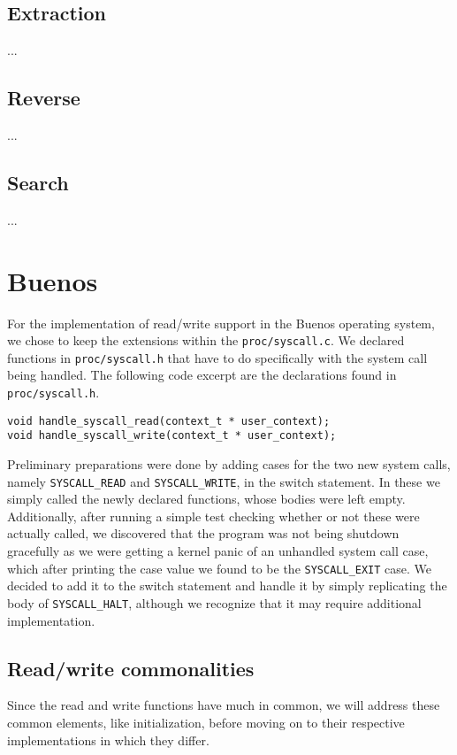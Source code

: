 \documentclass[11pt]{article}
\newcommand{\code}[1]{{\tt #1}}
\newcommand{\file}[1]{{\tt #1}}
\begin{document}
\subsection{Extraction}
...

\subsection{Reverse}
...

\subsection{Search}
...

\newpage
\section{Buenos}
For the implementation of read/write support in the Buenos operating system,
we chose to keep the extensions within the \file{proc/syscall.c}. We declared
functions in \file{proc/syscall.h} that have to do specifically with the
system call being handled. The following code excerpt are the declarations
found in \file{proc/syscall.h}.

\begin{lstlisting}
void handle_syscall_read(context_t * user_context);
void handle_syscall_write(context_t * user_context);
\end{lstlisting}

Preliminary preparations were done by adding cases for the two new system
calls, namely \code{SYSCALL\_READ} and \code{SYSCALL\_WRITE}, in the switch
statement. In these we simply called the newly declared functions, whose
bodies were left empty. Additionally, after running a simple test checking
whether or not these were actually called, we discovered that the program was
not being shutdown gracefully as we were getting a kernel panic of an
unhandled system call case, which after printing the case value we found to be
the \code{SYSCALL\_EXIT} case. We decided to add it to the switch statement
and handle it by simply replicating the body of \code{SYSCALL\_HALT}, although
we recognize that it may require additional implementation.

\subsection{Read/write commonalities}
Since the read and write functions have much in common, we will address these
common elements, like initialization, before moving on to their respective
implementations in which they differ.
\end{document}
